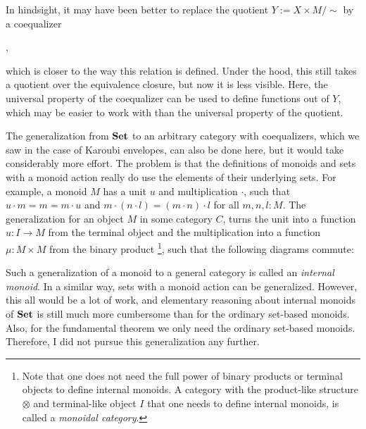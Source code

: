 In hindsight, it may have been better to replace the quotient $ Y := X \times M / \sim $ by a coequalizer
\begin{center}
  ,
\end{center}
which is closer to the way this relation is defined. Under the hood, this still takes a quotient over the equivalence closure, but now it is less visible. Here, the universal property of the coequalizer can be used to define functions out of $ Y $, which may be easier to work with than the universal property of the quotient.

The generalization from $ \mathbf{Set} $ to an arbitrary category with coequalizers, which we saw in the case of Karoubi envelopes, can also be done here, but it would take considerably more effort. The problem is that the definitions of monoids and sets with a monoid action really do use the elements of their underlying sets. For example, a monoid $ M $ has a unit $ u $ and multiplication $ \cdot $, such that $ u \cdot m = m = m \cdot u $ and $ m \cdot (n \cdot l) = (m \cdot n) \cdot l $ for all $ m, n, l : M $. The generalization for an object $ M $ in some category $ C $, turns the unit into a function $ u : I \to M $ from the terminal object and the multiplication into a function $ \mu : M \times M $ from the binary product
\footnote{Note that one does not need the full power of binary products or terminal objects to define internal monoids. A category with the product-like structure $ \otimes $ and terminal-like object $ I $ that one needs to define internal monoids, is called a \textit{monoidal category}.},
such that the following diagrams commute:
\begin{center}
\end{center}
Such a generalization of a monoid to a general category is called an \textit{internal monoid}. In a similar way, sets with a monoid action can be generalized. However, this all would be a lot of work, and elementary reasoning about internal monoids of $ \mathbf{Set} $ is still much more cumbersome than for the ordinary set-based monoids. Also, for the fundamental theorem we only need the ordinary set-based monoids. Therefore, I did not pursue this generalization any further.

